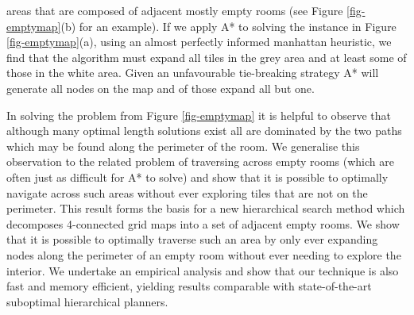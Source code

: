  areas that are composed of adjacent mostly empty rooms (see Figure \ref{fig-emptymap}(b) for an example).
If we apply A* \cite{hart68} to solving the instance in Figure \ref{fig-emptymap}(a), using an almost 
perfectly informed manhattan heuristic, we find that the algorithm must expand all tiles in the grey 
area and at least some of those in the white area.
Given an unfavourable tie-breaking strategy A* will generate all nodes on the map and of those expand 
all but one.
\par
In solving the problem from Figure \ref{fig-emptymap} it is helpful to observe that although many optimal 
length solutions exist all are dominated by the two paths which may be found along the perimeter of 
the room. 
We generalise this observation to the related problem of traversing across empty rooms (which are 
often just as difficult for A* to solve) and show that it is possible to optimally navigate across 
such areas without ever exploring tiles that are not on the perimeter.
This result forms the basis for a new hierarchical search method which decomposes 4-connected grid maps
into a set of adjacent empty rooms. 
We show that it is possible to optimally traverse such an area by only ever expanding nodes along the
perimeter of an empty room without ever needing to explore the interior.
We undertake an empirical analysis and show that our technique is also fast and memory efficient,
yielding results comparable with state-of-the-art suboptimal hierarchical planners.
